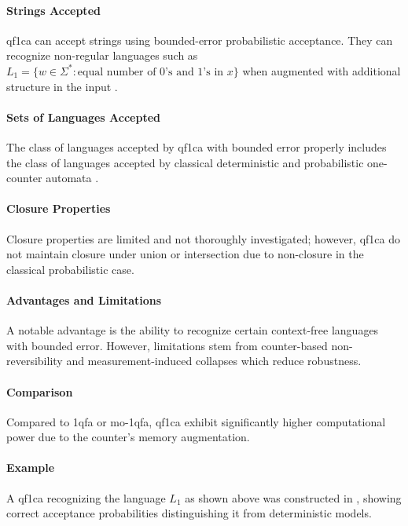 \paragraph{Strings Accepted} 
\gls{qf1ca} can accept strings using bounded-error probabilistic acceptance. They can recognize non-regular languages such as $L_1 = \{ w \in \Sigma^* : \text{equal number of 0's and 1's in } x \}$ when augmented with additional structure in the input \cite{bonner2001quantum}.

\paragraph{Sets of Languages Accepted} 
The class of languages accepted by \gls{qf1ca} with bounded error properly includes the class of languages accepted by classical deterministic and probabilistic one-counter automata \cite{bonner2001quantum}.

\paragraph{Closure Properties} 
Closure properties are limited and not thoroughly investigated; however, \gls{qf1ca} do not maintain closure under union or intersection due to non-closure in the classical probabilistic case.

\paragraph{Advantages and Limitations} 
A notable advantage is the ability to recognize certain context-free languages with bounded error. However, limitations stem from counter-based non-reversibility and measurement-induced collapses which reduce robustness.

\paragraph{Comparison} 
Compared to \gls{1qfa} or \gls{mo-1qfa}, \gls{qf1ca} exhibit significantly higher computational power due to the counter's memory augmentation.

\paragraph{Example} 
A \gls{qf1ca} recognizing the language $L_1$ as shown above was constructed in \cite{bonner2001quantum}, showing correct acceptance probabilities distinguishing it from deterministic models.

